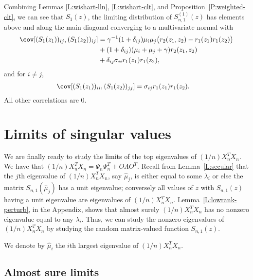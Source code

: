 Combining Lemmas \ref{L:wishart-lln}, \ref{L:wishart-clt}, and Proposition~\ref{P:weighted-clt}, we can see that $S_1(z)$, the limiting distribution of
$S_{n,1}^{(1)}(z)$ has elements above and along the main diagonal converging
to a multivariate normal with
\begin{align}
    \cov[ (S_1(z_1))_{ij}, (S_1(z_2))_{ij} ]
    &= \gamma^{-1} (1 + \delta_{ij}) \mu_i \mu_j 
                 \big( r_2 (z_1, z_2) - r_1(z_1) r_1 (z_2) \big) \notag \\
      &+ (1 + \delta_{ij}) (\mu_i + \mu_j + \gamma) r_2(z_1, z_2) \notag \\
      &+ \delta_{ij} \sigma_{ii} r_1(z_1) r_1(z_2), \label{E:cov-S1-1}
\end{align}
and for $i \neq j$,
\begin{align}
    \cov[ (S_1(z_1))_{ii}, (S_1(z_2))_{jj} ]
    &= \sigma_{ij} r_1(z_1) r_1(z_2). \label{E:cov-S1-2}
\end{align}
All other correlations are $0$.

\section{Limits of singular values}

We are finally ready to study the limits of the top eigenvalues of
$(1/n) X_n^T X_n$.  We have that
$(1/n) X_n^T X_n = \Psi_n \Psi_n^T + O \Lambda O^T$. Recall from
Lemma~\ref{L:secular} that the $j$th eigenvalue of $(1/n) X_n^T X_n$, say 
$\hat \mu_j$, is either equal to some $\lambda_i$ or else the matrix
$S_{n,1}(\hat \mu_j)$ has a unit eigenvalue; conversely all values of $z$ with
$S_{n,1}(z)$ having a unit eigenvalue are eigenvalues of $(1/n) X_n^T X_n$.
Lemma~\ref{L:lowrank-perturb}, in the Appendix, shows that  almost surely
$(1/n) X_n^T X_n$ has no nonzero eigenvalue equal to any $\lambda_i$.  Thus,
we can study the nonzero eigenvalues of $(1/n) X_n^T X_n$ by studying the
random matrix-valued function $S_{n,1}(z)$.

We denote by $\hat \mu_i$ the $i$th largest eigenvalue of $(1/n) X_n^T X_n$.

\subsection{Almost sure limits}\label{SS:value-limit}

